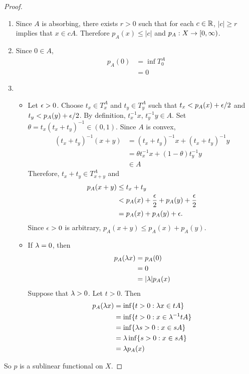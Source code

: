 \documentclass{book}
\begin{document}
	\begin{proof}\
		\begin{enumerate}
			\item Since $A$ is absorbing, there exists $r >0$ such that for each $c \in \mathbb{R}$, $|c| \geq r$ implies that $x \in cA$. Therefore $p_A(x) \leq |c|$ and $p_A: X \rightarrow [0,\infty)$.
			\item Since $0 \in A$, 
			\begin{align*}
				p_A(0) 
				&= \inf T^A_0 \\
				&= 0
			\end{align*}
			\item \begin{itemize}
				\item Let $\epsilon >0$. Choose $t_x \in T^A_x$ and $t_y \in T^A_y$ such that $t_x < p_A(x) + \epsilon/2$ and $t_y < p_A(y) + \epsilon/2$. By definition, $t_x^{-1}x$, $t_y^{-1}y \in A$. Set $\theta = t_x(t_x +t_y)^{-1} \in (0, 1)$. Since $A$ is convex, 
				\begin{align*}
					(t_x +t_y)^{-1}(x+y) 
					&= (t_x +t_y)^{-1}x + (t_x +t_y)^{-1}y \\
					&= \theta t_x^{-1}x + (1 - \theta)t_y^{-1}y \\
					& \in A
				\end{align*}
				Therefore, $t_x + t_y \in T^A_{x+y}$ and 
				\begin{align*}
					p_A(x+y) 
					& \leq t_x + t_y \\
					& < p_A(x) + \frac{\epsilon}{2} + p_A(y) + \frac{\epsilon}{2} \\
					& = p_A(x) + p_A(y) + \epsilon.
				\end{align*}
				Since $\epsilon >0$ is arbitrary, $p_A(x+y) \leq p_A(x) + p_A(y)$.
				\item If $\lambda =0$, then 
				\begin{align*}
					p_A(\lambda x) 
					&= p_A(0) \\
					&= 0 \\
					&= |\lambda| p_A(x)
				\end{align*}
				Suppose that $\lambda > 0$. Let $t >0$. Then
				\begin{align*}
					p_A(\lambda x) 
					&= \inf \{t > 0: \lambda x \in tA\} \\
					&= \inf \{t > 0: x \in \lambda^{-1} tA\} \\
					&= \inf \{\lambda s > 0: x \in sA\} \\
					&= \lambda \inf \{ s > 0: x \in sA\} \\
					&= \lambda p_A(x)
				\end{align*}
			\end{itemize}
		\end{enumerate}
		So $p$ is a sublinear functional on $X$. 
	\end{proof}
\end{document}
